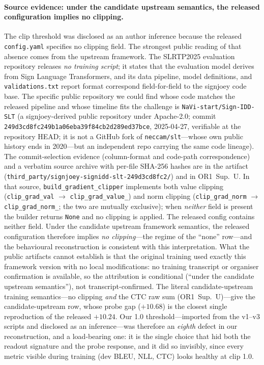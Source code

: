 \documentclass[pdflatex,sn-chicago]{sn-jnl}
\begin{document}
\paragraph{Source evidence: under the candidate upstream semantics, the released configuration implies no clipping.}
\label{sec:clip_source}
The clip threshold was disclosed as an author inference because the released \texttt{config.yaml} specifies no clipping field. The strongest public reading of that absence comes from the upstream framework. The SLRTP2025 evaluation repository releases \emph{no training script}; it states that the evaluation model derives from Sign Language Transformers, and its data pipeline, model definitions, and \texttt{validations.txt} report format correspond field-for-field to the signjoey code base. The specific public repository we could find whose code matches the released pipeline and whose timeline fits the challenge is \texttt{NaVi-start/Sign-IDD-SLT} (a signjoey-derived public repository under Apache-2.0; commit \texttt{249d3cd8fc249b1a06eba39f84cb2d289ed37bce}, 2025-04-27, verifiable at the repository HEAD; it is not a GitHub fork of \texttt{neccam/slt}---whose own public history ends in 2020---but an independent repo carrying the same code lineage). The commit-selection evidence (column-format and code-path correspondence) and a verbatim source archive with per-file SHA-256 hashes are in the artifact (\texttt{third\_party/signjoey-signidd-slt-249d3cd8fc2/}) and in OR1~Sup.~U. In that source, \texttt{build\_gradient\_clipper} implements both value clipping (\texttt{clip\_grad\_val} $\to$ \texttt{clip\_grad\_value\_}) and norm clipping (\texttt{clip\_grad\_norm} $\to$ \texttt{clip\_grad\_norm\_}; the two are mutually exclusive); when \emph{neither} field is present the builder returns \texttt{None} and no clipping is applied. The released config contains neither field. Under the candidate upstream framework semantics, the released configuration therefore implies \emph{no clipping}---the regime of the ``none'' row---and the behavioural reconstruction is consistent with this interpretation. What the public artifacts cannot establish is that the original training used exactly this framework version with no local modifications: no training transcript or organiser confirmation is available, so the attribution is conditional (``under the candidate upstream semantics''), not transcript-confirmed. The literal candidate-upstream training semantics---no clipping \emph{and} the CTC raw sum (OR1~Sup.~U)---give the candidate-upstream row, whose probe gap ($+10.68$) is the closest single reproduction of the released $+10.24$. Our 1.0 threshold---imported from the v1--v3 scripts and disclosed as an inference---was therefore an \emph{eighth} defect in our reconstruction, and a load-bearing one: it is the single choice that hid both the readout signature and the probe response, and it did so invisibly, since every metric visible during training (dev BLEU, NLL, CTC) looks healthy at clip 1.0.
\end{document}
